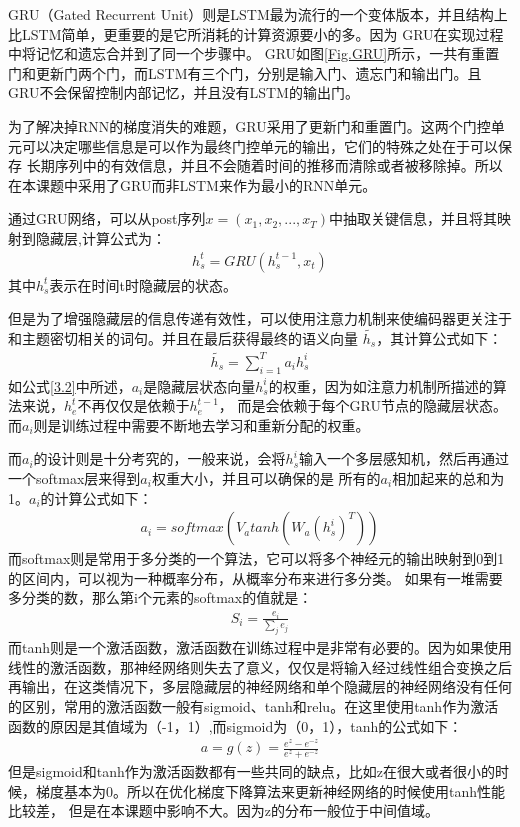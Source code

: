 \documentclass[supercite]{HustGraduPaper}
\theoremstyle{definition}
\begin{document}
GRU\cite{dey2017gate}（Gated Recurrent Unit）则是LSTM最为流行的一个变体版本，并且结构上比LSTM简单，更重要的是它所消耗的计算资源要小的多。因为
GRU在实现过程中将记忆和遗忘合并到了同一个步骤中。
GRU如图\ref{Fig.GRU}所示，一共有重置门和更新门两个门，而LSTM有三个门，分别是输入门、遗忘门和输出门。且GRU不会保留控制内部记忆，并且没有LSTM的输出门。

为了解决掉RNN的梯度消失的难题，GRU采用了更新门和重置门。这两个门控单元可以决定哪些信息是可以作为最终门控单元的输出，它们的特殊之处在于可以保存
长期序列中的有效信息，并且不会随着时间的推移而清除或者被移除掉。所以在本课题中采用了GRU而非LSTM来作为最小的RNN单元。

通过GRU网络，可以从post序列$x = (x_1,x_2,...,x_T)$中抽取关键信息，并且将其映射到隐藏层,计算公式为：
\begin{align}
  h_s^t = GRU(h_s^{t-1},x_t) \label{3.1}
\end{align}
其中$h_s^t$表示在时间t时隐藏层的状态。

但是为了增强隐藏层的信息传递有效性，可以使用注意力机制来使编码器更关注于和主题密切相关的词句。并且在最后获得最终的语义向量
$\widetilde{h_s}$，其计算公式如下：
\begin{align}
  \widetilde{h_s} = \sum_{i=1}^{T}a_i h_s^i \label{3.2}
\end{align}
如公式\ref{3.2}中所述，$a_i$是隐藏层状态向量$h_s^i$的权重，因为如注意力机制所描述的算法来说，$h_e^t$不再仅仅是依赖于$h_e^{t-1}$，
而是会依赖于每个GRU节点的隐藏层状态。而$a_i$则是训练过程中需要不断地去学习和重新分配的权重。

而$a_i$的设计则是十分考究的，一般来说，会将$h_s^i$输入一个多层感知机，然后再通过一个softmax层来得到$a_i$权重大小，并且可以确保的是
所有的$a_i$相加起来的总和为1。$a_i$的计算公式如下：
\begin{align}
  a_i = softmax(V_a tanh(W_a(h_s^i)^T)) \label{3.3}
\end{align}
而softmax则是常用于多分类的一个算法，它可以将多个神经元的输出映射到0到1的区间内，可以视为一种概率分布，从概率分布来进行多分类。
如果有一堆需要多分类的数，那么第i个元素的softmax的值就是：
\begin{align}
  S_i = \frac{e_i}{\sum_j e_j}
\end{align}
而tanh则是一个激活函数，激活函数在训练过程中是非常有必要的。因为如果使用线性的激活函数，那神经网络则失去了意义，仅仅是将输入经过线性组合变换之后
再输出，在这类情况下，多层隐藏层的神经网络和单个隐藏层的神经网络没有任何的区别，常用的激活函数一般有sigmoid、tanh和relu。在这里使用tanh作为激活
函数的原因是其值域为（-1，1）,而sigmoid为（0，1），tanh的公式如下：
\begin{align}
  a = g(z) = \frac{e^z - e^{-z}}{e^z + e^{-z}}
\end{align}
但是sigmoid和tanh作为激活函数都有一些共同的缺点，比如z在很大或者很小的时候，梯度基本为0。所以在优化梯度下降算法来更新神经网络的时候使用tanh性能比较差，
但是在本课题中影响不大。因为z的分布一般位于中间值域。
\end{document}
